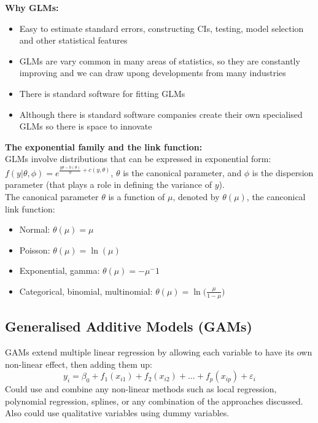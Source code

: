 \documentclass[11pt]{article}
\begin{document}
\noindent \textbf{Why GLMs:}
\begin{itemize}
    \item Easy to estimate standard errors, constructing CIs, testing, model selection and other statistical features
    \item GLMs are vary common in many areas of statistics, so they are constantly improving and we can draw upong developments from many industries
    \item There is standard software for fitting GLMs
    \item Although there is standard software companies create their own specialised GLMs so there is space to innovate
\end{itemize} \phantom{i}

\noindent \textbf{The exponential family and the link function:} \\
\noindent GLMs involve distributions that can be expressed in exponential form: $f(y|\theta, \phi) = e^{\frac{y\theta - b(\theta)}{\phi} + c(y,\theta)}$, $\theta$ is the canonical parameter, and $\phi$ is the dispersion parameter (that plays a role in defining the variance of $y$). \\

\noindent The canonical parameter $\theta$ is a function of $\mu$, denoted by $\theta(\mu)$, the canconical link function:
\begin{itemize}
    \item Normal: $\theta(\mu) = \mu$
    \item Poisson: $\theta(\mu) = \ln(\mu)$
    \item Exponential, gamma: $\theta(\mu) = -\mu^-1$
    \item Categorical, binomial, multinomial: $\theta(\mu) = \ln\Big( \frac{\mu}{1-\mu} \Big)$
\end{itemize}

\subsection{Generalised Additive Models (GAMs)}
\noindent GAMs extend multiple linear regression by allowing each variable to have its own non-linear effect, then adding them up:
$$y_i = \beta_0 + f_1(x_{i1}) + f_2(x_{i2}) + ... + f_p(x_{ip}) + \varepsilon_i$$
\noindent Could use and combine any non-linear methods such as local regression, polynomial regression, splines, or any combination of the approaches discussed. Also could use qualitative variables using dummy variables.
\end{document}
